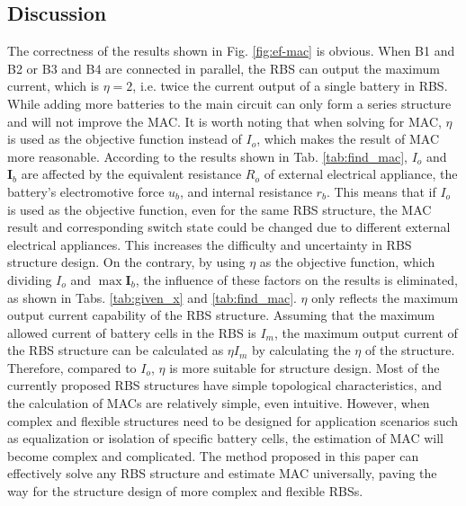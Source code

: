 \documentclass{article}
\begin{document}
\subsection{Discussion}

The correctness of the results shown in Fig. \ref{fig:ef-mac} is obvious. 
When B1 and B2 or B3 and B4 are connected in parallel, the RBS can output the maximum current, which is $\eta=2$, i.e. twice the current output of a single battery in RBS.
While adding more batteries to the main circuit can only form a series structure and will not improve the MAC.
It is worth noting that when solving for MAC, $\eta$ is used as the objective function instead of $I_o$, which makes the result of MAC more reasonable. 
According to the results shown in Tab. \ref{tab:find_mac}, $I_o$ and $\bm{I}_b$ are affected by the equivalent resistance $R_o$ of external electrical appliance, the battery's electromotive force $u_b$, and internal resistance $r_b$. 
This means that if $I_o$ is used as the objective function, even for the same RBS structure, the MAC result and corresponding switch state could be changed due to different external electrical appliances. 
This increases the difficulty and uncertainty in RBS structure design. 
On the contrary, by using $\eta$ as the objective function, which dividing $I_o$ and $\max\bm{I}_b$, the influence of these factors on the results is eliminated, as shown in Tabs. \ref{tab:given_x} and \ref{tab:find_mac}.
$\eta$ only reflects the maximum output current capability of the RBS structure.
Assuming that the maximum allowed current of battery cells in the RBS is $I_m$, the maximum output current of the RBS structure can be calculated as $\eta I_m$ by calculating the $\eta$ of the structure. 
Therefore, compared to $I_o$, $\eta$ is more suitable for structure design. 
Most of the currently proposed RBS structures\cite{ciNovelDesignAdaptive2007,alahmadBatterySwitchArray2008,kimDependableEfficientScalable2010b,kimBalancedReconfigurationStorage2011a,taesickimSeriesconnectedSelfreconfigurableMulticell2012a,6843711} have simple topological characteristics, and the calculation of MACs are relatively simple, even intuitive.
However, when complex and flexible structures need to be designed for application scenarios such as equalization or isolation of specific battery cells, the estimation of MAC will become complex and complicated. 
The method proposed in this paper can effectively solve any RBS structure and estimate MAC universally, paving the way for the structure design of more complex and flexible RBSs.
\end{document}
